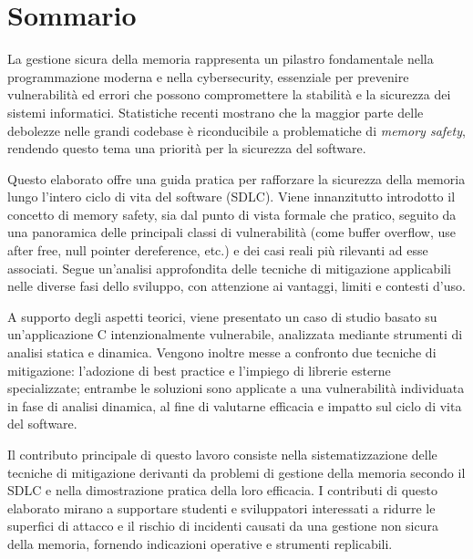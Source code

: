 \chapter*{Sommario}
\label{cha:sommario}

La gestione sicura della memoria rappresenta un pilastro fondamentale nella
programmazione moderna e nella cybersecurity, essenziale per prevenire vulnerabilità
ed errori che possono compromettere la stabilità e la sicurezza dei sistemi informatici.
Statistiche recenti mostrano che la maggior parte delle debolezze nelle grandi
codebase è riconducibile a problematiche di \textit{memory safety}, rendendo
questo tema una priorità per la sicurezza del software.

\vspace{0.5em}
\noindent
Questo elaborato offre una guida pratica per rafforzare la sicurezza della
memoria lungo l'intero ciclo di vita del software (SDLC). Viene innanzitutto introdotto
il concetto di memory safety, sia dal punto di vista formale che pratico, seguito
da una panoramica delle principali classi di vulnerabilità (come buffer overflow,
use after free, null pointer dereference, etc.) e dei casi reali più rilevanti ad
esse associati. Segue un'analisi approfondita delle tecniche di mitigazione
applicabili nelle diverse fasi dello sviluppo, con attenzione ai vantaggi,
limiti e contesti d'uso.

\vspace{0.5em}
\noindent
A supporto degli aspetti teorici, viene presentato un caso di studio basato su un'applicazione
C intenzionalmente vulnerabile, analizzata mediante strumenti di analisi statica
e dinamica. Vengono inoltre messe a confronto due tecniche di mitigazione: l'adozione
di best practice e l'impiego di librerie esterne specializzate; entrambe le soluzioni
sono applicate a una vulnerabilità individuata in fase di analisi dinamica, al
fine di valutarne efficacia e impatto sul ciclo di vita del software.

\vspace{0.5em}
\noindent
Il contributo principale di questo lavoro consiste nella sistematizzazione delle
tecniche di mitigazione derivanti da problemi di gestione della memoria secondo
il SDLC e nella dimostrazione pratica della loro efficacia. I contributi di questo
elaborato mirano a supportare studenti e sviluppatori interessati a ridurre le superfici
di attacco e il rischio di incidenti causati da una gestione non sicura della memoria,
fornendo indicazioni operative e strumenti replicabili.